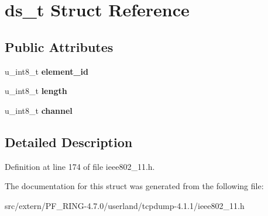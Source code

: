 \hypertarget{structds__t}{
\section{ds\_\-t Struct Reference}
\label{structds__t}
}
\subsection*{Public Attributes}
\begin{DoxyCompactItemize}
\item 
\hypertarget{structds__t_a6d7cf0ca07163d85717defc448b10f33}{
u\_\-int8\_\-t {\bfseries element\_\-id}}
\label{structds__t_a6d7cf0ca07163d85717defc448b10f33}

\item 
\hypertarget{structds__t_a5659e46afbd7f350bd3e7e9ac3f942be}{
u\_\-int8\_\-t {\bfseries length}}
\label{structds__t_a5659e46afbd7f350bd3e7e9ac3f942be}

\item 
\hypertarget{structds__t_ae8c8ea91b729c159a4f873432ac003bb}{
u\_\-int8\_\-t {\bfseries channel}}
\label{structds__t_ae8c8ea91b729c159a4f873432ac003bb}

\end{DoxyCompactItemize}


\subsection{Detailed Description}


Definition at line 174 of file ieee802\_\-11.h.



The documentation for this struct was generated from the following file:\begin{DoxyCompactItemize}
\item 
src/extern/PF\_\-RING-\/4.7.0/userland/tcpdump-\/4.1.1/ieee802\_\-11.h\end{DoxyCompactItemize}

